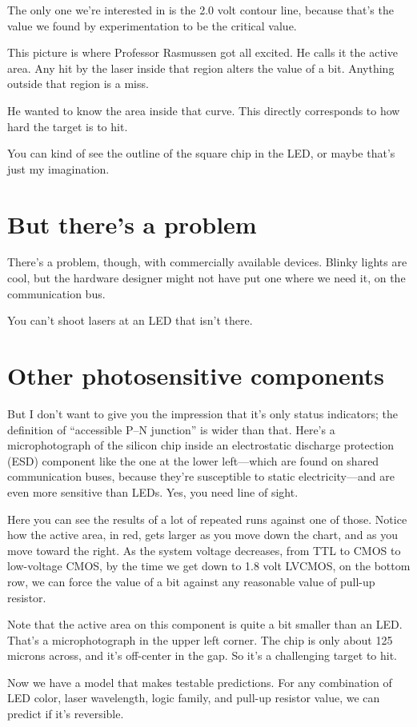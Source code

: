 \documentclass[letterpaper]{article}
\begin{document}
The only one we're interested in is the 2.0 volt contour line, because that's
the value we found by experimentation to be the critical value.

This picture is where Professor Rasmussen got all excited. He calls it the
active area. Any hit by the laser inside that region alters the value of a bit.
Anything outside that region is a miss.

He wanted to know the area inside that curve. This directly corresponds to how
hard the target is to hit.

You can kind of see the outline of the square chip in the LED, or maybe that's
just my imagination.
\section{But there's a problem}
There's a problem, though, with commercially available devices. Blinky lights
are cool, but the hardware designer might not have put one where we need it, on
the communication bus.

You can't shoot lasers at an LED that isn't there.
\section{Other photosensitive components}
But I don't want to give you the impression that it's only status indicators;
the definition of ``accessible P--N junction'' is wider than that. Here's a
microphotograph of the silicon chip inside an electrostatic discharge
protection (ESD) component like the one at the lower left---which are found on
shared communication buses, because they're susceptible to static
electricity---and are even more sensitive than LEDs. Yes, you need line of
sight.

Here you can see the results of a lot of repeated runs against one of those.
Notice how the active area, in red, gets larger as you move down the chart, and
as you move toward the right. As the system voltage decreases, from TTL to CMOS
to low-voltage CMOS, by the time we get down to 1.8 volt LVCMOS, on the bottom
row, we can force the value of a bit against any reasonable value of pull-up
resistor.

Note that the active area on this component is quite a bit smaller than an LED.
That's a microphotograph in the upper left corner. The chip is only about 125
microns across, and it's off-center in the gap. So it's a challenging target to
hit.

Now we have a model that makes testable predictions. For any combination of LED
color, laser wavelength, logic family, and pull-up resistor value, we can
predict if it's reversible.
\end{document}
